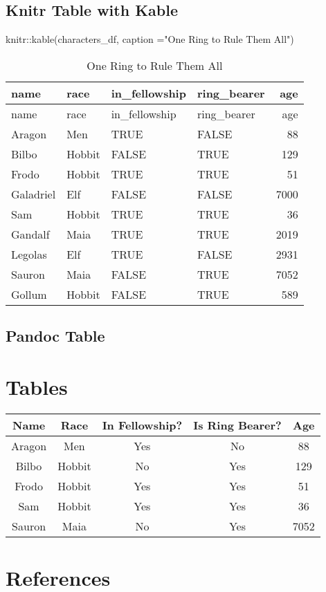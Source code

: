 \documentclass[
]{article}
\newenvironment{Shaded}{\begin{snugshade}}{\end{snugshade}}
\newcommand{\AttributeTok}[1]{\textcolor[rgb]{0.77,0.63,0.00}{#1}}
\newcommand{\FunctionTok}[1]{\textcolor[rgb]{0.00,0.00,0.00}{#1}}
\newcommand{\NormalTok}[1]{#1}
\newcommand{\SpecialCharTok}[1]{\textcolor[rgb]{0.00,0.00,0.00}{#1}}
\newcommand{\StringTok}[1]{\textcolor[rgb]{0.31,0.60,0.02}{#1}}
\begin{document}
\hypertarget{knitr-table-with-kable}{%
\subsection{Knitr Table with Kable}\label{knitr-table-with-kable}}

\begin{Shaded}
\begin{Highlighting}[]
\NormalTok{knitr}\SpecialCharTok{::}\FunctionTok{kable}\NormalTok{(characters\_df, }\AttributeTok{caption =}\StringTok{"One Ring to Rule Them All"}\NormalTok{)}
\end{Highlighting}
\end{Shaded}

\begin{longtable}[]{@{}llllr@{}}
\caption{One Ring to Rule Them All}\tabularnewline
\toprule
name & race & in\_fellowship & ring\_bearer & age \\
\midrule
\endfirsthead
\toprule
name & race & in\_fellowship & ring\_bearer & age \\
\midrule
\endhead
Aragon & Men & TRUE & FALSE & 88 \\
Bilbo & Hobbit & FALSE & TRUE & 129 \\
Frodo & Hobbit & TRUE & TRUE & 51 \\
Galadriel & Elf & FALSE & FALSE & 7000 \\
Sam & Hobbit & TRUE & TRUE & 36 \\
Gandalf & Maia & TRUE & TRUE & 2019 \\
Legolas & Elf & TRUE & FALSE & 2931 \\
Sauron & Maia & FALSE & TRUE & 7052 \\
Gollum & Hobbit & FALSE & TRUE & 589 \\
\bottomrule
\end{longtable}

\hypertarget{pandoc-table}{%
\subsection{Pandoc Table}\label{pandoc-table}}

\hypertarget{tables-1}{%
\section{Tables}\label{tables-1}}

\begin{longtable}[]{@{}ccccc@{}}
\toprule
Name & Race & In Fellowship? & Is Ring Bearer? & Age \\
\midrule
\endhead
Aragon & Men & Yes & No & 88 \\
Bilbo & Hobbit & No & Yes & 129 \\
Frodo & Hobbit & Yes & Yes & 51 \\
Sam & Hobbit & Yes & Yes & 36 \\
Sauron & Maia & No & Yes & 7052 \\
\bottomrule
\end{longtable}

\hypertarget{references}{%
\section{References}\label{references}}
\end{document}
